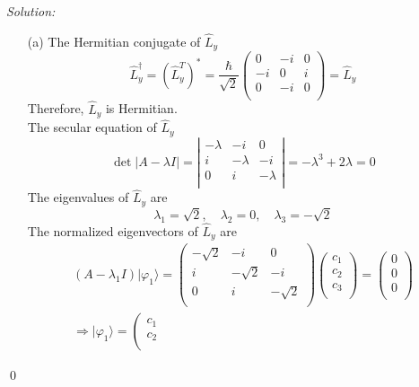 \documentclass[12pt,a4paper]{article}
\newenvironment{sol}
    {\emph{Solution:}
    }
    {
    \qed
    }
\begin{document}
\begin{sol}
\begin{itemize}
\item[(a)] The Hermitian conjugate of $\hat{L}_y$
\begin{equation}
\hat{L}_y^{\dagger}=(\hat{L}_y^T)^*=
\frac{\hbar}{\sqrt{2}}\left(\begin{array}{ccc}
0&-i&0\\
-i&0&i\\
0&-i&0\\
\end{array}\right)
=\hat{L}_y
\end{equation}
Therefore, $\hat{L}_y$ is Hermitian.\\
The secular equation of $\hat{L}_y$
\begin{equation}
\det|A-\lambda I|=
\left|\begin{array}{ccc}
-\lambda&-i&0\\
i&-\lambda&-i\\
0&i&-\lambda\\
\end{array}\right|
=-\lambda^3+2\lambda=0
\end{equation}
The eigenvalues of $\hat{L}_y$ are
\begin{equation}
\lambda_1=\sqrt{2},\quad\lambda_2=0,\quad\lambda_3=-\sqrt{2}
\end{equation}
The normalized eigenvectors of $\hat{L}_y$ are
\begin{gather}
\nonumber(A-\lambda_1I)|\varphi_1\rangle
=
\left(\begin{array}{ccc}
-\sqrt{2}&-i&0\\
i&-\sqrt{2}&-i\\
0&i&-\sqrt{2}\\
\end{array}\right)
\left(\begin{array}{c}
c_1\\
c_2\\
c_3\\
\end{array}\right)
=
\left(\begin{array}{c}
0\\
0\\
0\\
\end{array}\right)\\
\Longrightarrow|\varphi_1\rangle=
\left(\begin{array}{c}
c_1\\
c_2\\

\end{array}
\end{gather}
\end{itemize}
\end{sol}
\end{document}
